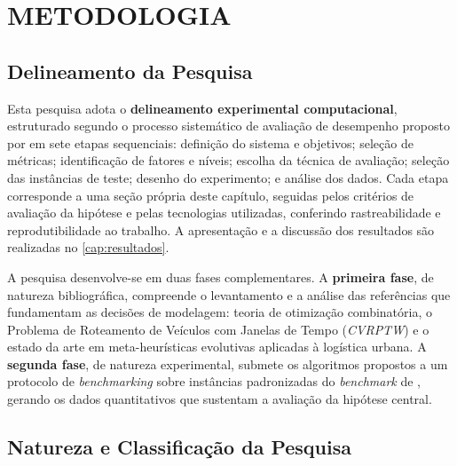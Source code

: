\chapter{METODOLOGIA}
\label{cap:metodologia}

\section{Delineamento da Pesquisa}
\label{sec:delineamento}

Esta pesquisa adota o \textbf{delineamento experimental computacional}, estruturado
segundo o processo sistemático de avaliação de desempenho proposto por
 em sete etapas sequenciais: definição do sistema e objetivos;
seleção de métricas; identificação de fatores e níveis; escolha da técnica de
avaliação; seleção das instâncias de teste; desenho do experimento; e análise dos
dados. Cada etapa corresponde a uma seção própria deste capítulo, seguidas pelos
critérios de avaliação da hipótese e pelas tecnologias utilizadas, conferindo
rastreabilidade e reprodutibilidade ao trabalho. A apresentação e a discussão dos
resultados são realizadas no \autoref{cap:resultados}.

A pesquisa desenvolve-se em duas fases complementares. A \textbf{primeira fase}, de
natureza bibliográfica, compreende o levantamento e a análise das referências que
fundamentam as decisões de modelagem: teoria de otimização combinatória, o Problema de
Roteamento de Veículos com Janelas de Tempo (\textit{CVRPTW}) e o estado da arte em
meta-heurísticas evolutivas aplicadas à logística urbana. A \textbf{segunda fase}, de
natureza experimental, submete os algoritmos propostos a um protocolo de
\textit{benchmarking} sobre instâncias padronizadas do \textit{benchmark} de
, gerando os dados
quantitativos que sustentam a avaliação da hipótese central.

\section{Natureza e Classificação da Pesquisa}
\label{sec:natureza}

